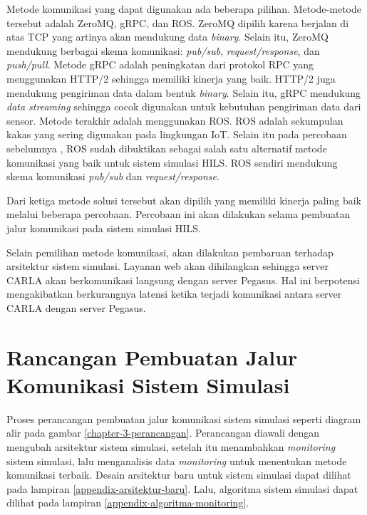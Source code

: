Metode komunikasi yang dapat digunakan ada beberapa pilihan. Metode-metode
tersebut adalah ZeroMQ, gRPC, dan ROS. ZeroMQ dipilih karena berjalan di atas
TCP yang artinya akan mendukung data \textit{binary}. Selain itu, ZeroMQ
mendukung berbagai skema komunikasi: \textit{pub/sub},
\textit{request/response}, dan \textit{push/pull}. Metode gRPC adalah
peningkatan dari protokol RPC yang menggunakan HTTP/2 sehingga memiliki
kinerja yang baik. HTTP/2 juga mendukung pengiriman data dalam bentuk
\textit{binary}.  Selain itu, gRPC mendukung \textit{data streaming} sehingga
cocok digunakan untuk kebutuhan pengiriman data dari sensor. Metode terakhir
adalah menggunakan ROS. ROS adalah sekumpulan kakas yang sering digunakan pada
lingkungan IoT. Selain itu pada percobaan sebelumnya
\parencite{brogle_CarlaHILS}, ROS sudah dibuktikan sebagai salah satu alternatif
metode komunikasi yang baik untuk sistem simulasi HILS. ROS sendiri mendukung
skema komunikasi \textit{pub/sub} dan \textit{request/response}.

Dari ketiga metode solusi tersebut akan dipilih yang memiliki kinerja paling
baik melalui beberapa percobaan. Percobaan ini akan dilakukan selama pembuatan
jalur komunikasi pada sistem simulasi HILS.

Selain pemilihan metode komunikasi, akan dilakukan pembaruan terhadap arsitektur
sistem simulasi. Layanan web akan dihilangkan sehingga server CARLA akan
berkomunikasi langsung dengan server Pegasus. Hal ini berpotensi mengakibatkan
berkurangnya latensi ketika terjadi komunikasi antara server CARLA dengan server
Pegasus.

\section{Rancangan Pembuatan Jalur Komunikasi Sistem Simulasi}

Proses perancangan pembuatan jalur komunikasi sistem simulasi seperti diagram
alir pada gambar \ref{chapter-3-perancangan}. Perancangan diawali dengan
mengubah arsitektur sistem simulasi, setelah itu menambahkan \textit{monitoring}
sistem simulasi, lalu menganalisis data \textit{monitoring} untuk menentukan
metode komunikasi terbaik. Desain arsitektur baru untuk sistem simulasi dapat
dilihat pada lampiran \ref{appendix-arsitektur-baru}. Lalu, algoritma sistem
simulasi dapat dilihat pada lampiran \ref{appendix-algoritma-monitoring}.

